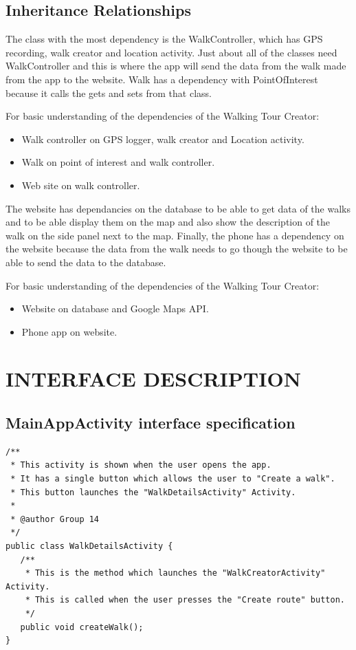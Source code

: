 \documentclass{project}
\begin{document}
\newpage

\subsection{Inheritance Relationships}
The class with the most dependency is the WalkController, which has GPS
recording, walk creator and location activity. Just about all of the classes
need WalkController and this is where the app will send the data from the walk
made from the app to the website. Walk has a dependency with PointOfInterest
because it calls the gets and sets from that class. 

For basic understanding of the dependencies of the Walking Tour Creator:
\begin{itemize}
\item Walk controller on GPS logger, walk creator and Location activity.
\item Walk on point of interest and walk controller.
\item Web site on walk controller.
\end{itemize}

The website has dependancies on the database to be able to get data of the
walks and to be able display them on the map and also show the description of
the walk on the side panel next to the map. Finally, the phone has a dependency
on the website because the data from the walk needs to go though the website to
be able to send the data to the database.      

For basic understanding of the dependencies of the Walking Tour Creator:
\begin{itemize}
\item Website on database and Google Maps API.
\item Phone app on website. 
\end{itemize}

\newpage

\section{INTERFACE DESCRIPTION}
\subsection{MainAppActivity interface specification}
\begin{verbatim}/**
 * This activity is shown when the user opens the app.
 * It has a single button which allows the user to "Create a walk". 
 * This button launches the "WalkDetailsActivity" Activity.
 *
 * @author Group 14
 */
public class WalkDetailsActivity {
   /**
    * This is the method which launches the "WalkCreatorActivity" Activity.
    * This is called when the user presses the "Create route" button.
    */
   public void createWalk();
}\end{verbatim}
\end{document}
